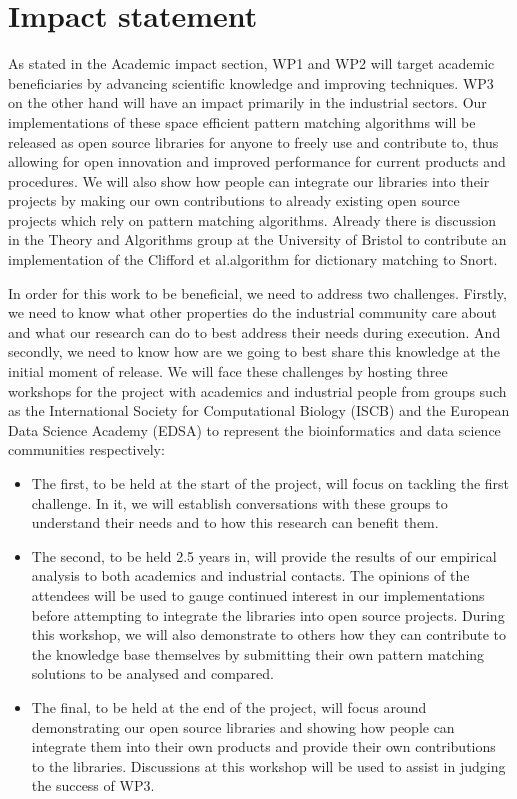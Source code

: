\documentclass[a4paper,11pt]{article}
\begin{document}
    \newpage
    \section{Impact statement}

    As stated in the Academic impact section, WP1 and WP2 will target academic beneficiaries by advancing scientific knowledge and improving techniques. WP3 on the other hand will have an impact primarily in the industrial sectors. Our implementations of these space efficient pattern matching algorithms will be released as open source libraries for anyone to freely use and contribute to, thus allowing for open innovation and improved performance for current products and procedures. We will also show how people can integrate our libraries into their projects by making our own contributions to already existing open source projects which rely on pattern matching algorithms. Already there is discussion in the Theory and Algorithms group at the University of Bristol to contribute an implementation of the Clifford et al.\@ algorithm for dictionary matching to Snort.

    In order for this work to be beneficial, we need to address two challenges. Firstly, we need to know what other properties do the industrial community care about and what our research can do to best address their needs during execution. And secondly, we need to know how are we going to best share this knowledge at the initial moment of release. We will face these challenges by hosting three workshops for the project with academics and industrial people from groups such as the International Society for Computational Biology (ISCB) and the European Data Science Academy (EDSA) to represent the bioinformatics and data science communities respectively:

    \begin{itemize}
        \item The first, to be held at the start of the project, will focus on tackling the first challenge. In it, we will establish conversations with these groups to understand their needs and to how this research can benefit them.
        \item The second, to be held 2.5 years in, will provide the results of our empirical analysis to both academics and industrial contacts. The opinions of the attendees will be used to gauge continued interest in our implementations before attempting to integrate the libraries into open source projects. During this workshop, we will also demonstrate to others how they can contribute to the knowledge base themselves by submitting their own pattern matching solutions to be analysed and compared.
        \item The final, to be held at the end of the project, will focus around demonstrating our open source libraries and showing how people can integrate them into their own products and provide their own contributions to the libraries. Discussions at this workshop will be used to assist in judging the success of WP3.
    \end{itemize}
\end{document}
